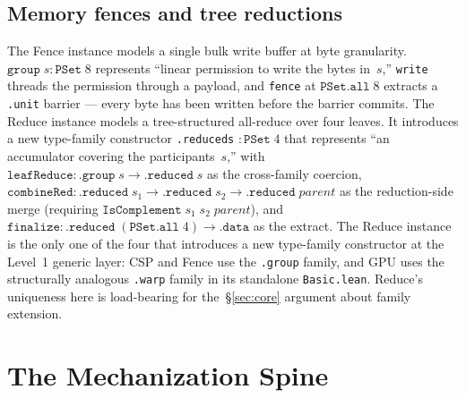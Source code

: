 \documentclass[acmsmall,screen,review,anonymous,nonacm]{acmart}
\newcommand{\PSet}{\texttt{PSet}}
\newcommand{\IsComplement}{\texttt{IsComplement}}
\begin{document}
\subsection{Memory fences and tree reductions}\label{sec:memory-fences-and-tree-reductions}

The Fence instance models a single bulk write buffer at byte granularity. $\texttt{group}\;s : \PSet\;8$ represents ``linear permission to write the bytes in~$s$,'' \texttt{write} threads the permission through a payload, and \texttt{fence} at $\texttt{PSet.all}\;8$ extracts a \texttt{.unit} barrier --- every byte has been written before the barrier commits. The Reduce instance models a tree-structured all-reduce over four leaves. It introduces a new type-family constructor \texttt{.reduced\;s} $: \PSet\;4$ that represents ``an accumulator covering the participants~$s$,'' with $\texttt{leafReduce} : \texttt{.group}\;s \to \texttt{.reduced}\;s$ as the cross-family coercion, $\texttt{combineRed} : \texttt{.reduced}\;s_1 \to \texttt{.reduced}\;s_2 \to \texttt{.reduced}\;\mathit{parent}$ as the reduction-side merge (requiring $\IsComplement\;s_1\;s_2\;\mathit{parent}$), and $\texttt{finalize} : \texttt{.reduced}\;(\texttt{PSet.all}\;4) \to \texttt{.data}$ as the extract. The Reduce instance is the only one of the four that introduces a new type-family constructor at the Level~1 generic layer: CSP and Fence use the \texttt{.group} family, and GPU uses the structurally analogous \texttt{.warp} family in its standalone \texttt{Basic.lean}. Reduce's uniqueness here is load-bearing for the~\S\ref{sec:core} argument about family extension.


\section{The Mechanization Spine}\label{sec:spine}
\end{document}
